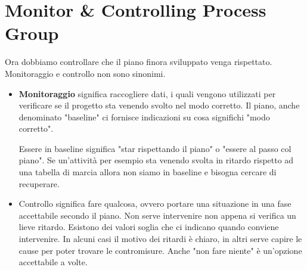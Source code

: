 \section{Monitor \& Controlling Process Group}
Ora dobbiamo controllare che il piano finora sviluppato venga rispettato. Monitoraggio e controllo non sono sinonimi.
\begin{itemize}
	\item \textbf{Monitoraggio} significa raccogliere dati, i quali vengono utilizzati per verificare se il progetto sta venendo svolto nel modo corretto. Il piano, anche denominato "baseline" ci fornisce indicazioni su cosa significhi "modo corretto".
	\begin{info}
		Essere in baseline significa "star rispettando il piano" o "essere al passo col piano". Se un'attività per esempio sta venendo svolta in ritardo rispetto ad una tabella di marcia allora non siamo in baseline e bisogna cercare di recuperare.
	\end{info}
	\item Controllo significa fare qualcosa, ovvero portare una situazione in una fase accettabile secondo il piano. Non serve intervenire non appena si verifica un lieve ritardo. Esistono dei valori soglia che ci indicano quando conviene intervenire. In alcuni casi il motivo dei ritardi è chiaro, in altri serve capire le cause per poter trovare le contromisure. Anche "non fare niente" è un'opzione accettabile a volte.
\end{itemize}

